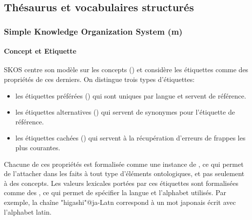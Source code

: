 \subsection{Thésaurus et vocabulaires structurés}\label{sec:thesaurus}
\subsubsection{Simple Knowledge Organization System (m)}\label{sec:skos}

\paragraph{Concept et Etiquette}
SKOS centre son modèle sur les concepts () et considère les étiquettes comme des propriétés de ces derniers. 
On distingue trois types d'étiquettes: 
\begin{itemize} 
	\item les étiquettes préférées () qui sont uniques par langue et servent de référence.
	\item les étiquettes alternatives () qui servent de synonymes pour l'étiquette de référence. 
	\item les étiquettes cachées () qui servent à la récupération d'erreurs de frappes les plus courantes. 
\end{itemize}
Chacune de ces propriétés est formalisée comme une instance de , ce qui permet de l'attacher dans les faits à tout type d'éléments ontologiques, et pas seulement à des concepts. 
Les valeurs lexicales portées par ces étiquettes sont formalisées comme des , ce qui permet de spécifier la langue et l'alphabet utilisés. 
Par exemple, la chaîne "higashi"@ja-Latn correspond à un mot japonais écrit avec l'alphabet latin.

